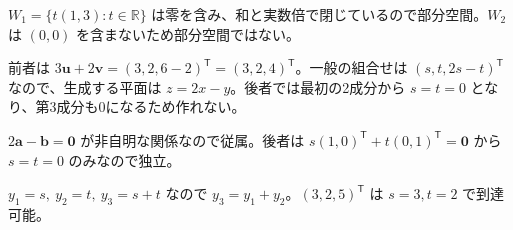 \documentclass[11pt]{article}
\begin{document}

\problem[部分空間の判定]
\begin{ans}
$W_1=\{t(1,3):t\in\mathbb R\}$ は零を含み、和と実数倍で閉じているので部分空間。$W_2$ は $(0,0)$ を含まないため部分空間ではない。
\end{ans}

\problem[生成の範囲]
\begin{ans}
前者は $3\boldsymbol u+2\boldsymbol v=(3,2,6-2)^{\mathsf T}=(3,2,4)^{\mathsf T}$。一般の組合せは $(s,t,2s-t)^{\mathsf T}$ なので、生成する平面は $z=2x-y$。後者では最初の2成分から $s=t=0$ となり、第3成分も0になるため作れない。
\end{ans}
\newpage

\problem[独立性]
\begin{ans}
$2\boldsymbol a-\boldsymbol b=\boldsymbol0$ が非自明な関係なので従属。後者は $s(1,0)^{\mathsf T}+t(0,1)^{\mathsf T}=\boldsymbol0$ から $s=t=0$ のみなので独立。
\end{ans}

\problem[出力制約]
\begin{ans}
$y_1=s,\ y_2=t,\ y_3=s+t$ なので $y_3=y_1+y_2$。$(3,2,5)^{\mathsf T}$ は $s=3,t=2$ で到達可能。
\end{ans}
\end{document}
